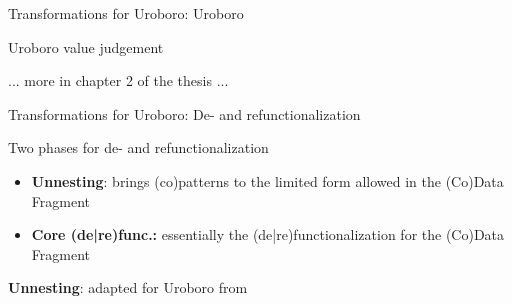 \documentclass[xcolor=svgnames]{beamer}
\begin{document}
\begin{frame}
  {Transformations for Uroboro: Uroboro}

   \begin{block}{Uroboro value judgement}
  \tiny{
  \begin{prooftree}
\end{prooftree}

\begin{prooftree}
\end{prooftree}

\begin{prooftree}
\end{prooftree}
}
  \end{block}

... more in chapter 2 of the thesis ...
\end{frame}


\begin{frame}[fragile]
  {Transformations for Uroboro: De- and refunctionalization}

  \begin{block}{Two phases for de- and refunctionalization}
    \begin{itemize}
      \item \textbf{Unnesting}: brings (co)patterns to the limited form allowed in the (Co)Data Fragment
      \item \textbf{Core (de|re)func.:} essentially the (de|re)functionalization for the (Co)Data Fragment
    \end{itemize}
  \end{block}

  \textbf{Unnesting}: adapted for Uroboro from \citet{setzer14unnesting}
\end{frame}
\end{document}
